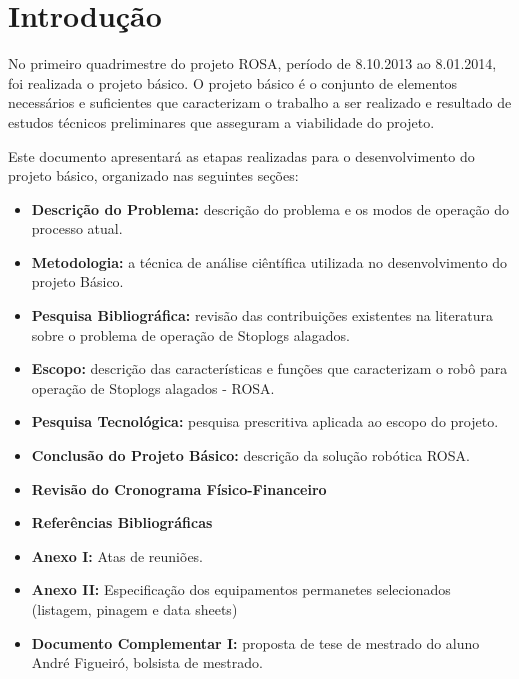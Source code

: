 


\section{Introdução}
No primeiro quadrimestre do projeto ROSA, período de 8.10.2013 ao 8.01.2014, foi realizada o projeto básico. O projeto básico é o conjunto de elementos necessários e suficientes que caracterizam o trabalho a ser realizado e resultado de estudos técnicos preliminares que asseguram a viabilidade do projeto. 

Este documento apresentará as etapas realizadas para o desenvolvimento do projeto básico, organizado nas seguintes seções:
    \begin{itemize}
        \item {\bf Descrição do Problema:} descrição do problema e os modos de operação do processo atual.
	\item {\bf Metodologia:} a técnica de análise ciêntífica utilizada no desenvolvimento do projeto Básico.
        \item {\bf Pesquisa Bibliográfica:} revisão das contribuições existentes na literatura sobre o problema de operação de Stoplogs alagados.  
	\item {\bf Escopo:} descrição das características e funções que caracterizam o robô para operação de Stoplogs alagados - ROSA. 
        \item {\bf Pesquisa Tecnológica:} pesquisa prescritiva aplicada ao escopo do projeto. 
        \item {\bf Conclusão do Projeto Básico:} descrição da solução robótica ROSA. 
         \item {\bf Revisão do Cronograma Físico-Financeiro} 
        \item {\bf Referências Bibliográficas}
        \item {\bf Anexo I:} Atas de reuniões. 
        \item {\bf Anexo II:} Especificação dos equipamentos permanetes selecionados (listagem, pinagem e data sheets) 
        \item { \bf Documento Complementar I:} proposta de tese de mestrado do aluno André Figueiró, bolsista de mestrado. 

    \end{itemize}